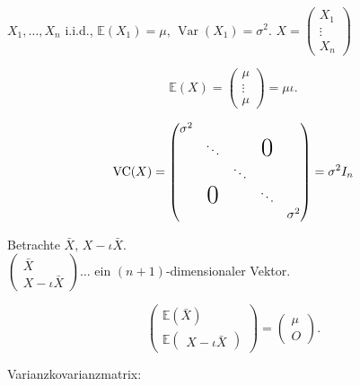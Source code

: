 \documentclass{tstextbook}
\DeclareMathOperator{\VC}{VC}
\DeclareMathOperator{\Var}{Var}
\begin{document}
\begin{example}
	\label{example.vc}
	
	$ X_1,\ldots,X_n $ i.i.d., $ \mathbb{E}{(X_1)}= \mu $, $ \Var(X_1) = \sigma^2 $.
	$ X = \begin{pmatrix}
		X_1 \\ \vdots \\ X_n
	\end{pmatrix} $ 

\[	\mathbb{E}(X) = \begin{pmatrix}
		\mu \\ \vdots \\ \mu
	\end{pmatrix} = \mu\iota. 
\]

\[ \VC(X) = \begin{pmatrix}
		
			\sigma^2 										\\
			& \ddots  		& 			& \text{\huge0}		\\
			& 				& \ddots               			\\
			& \text{\huge0} & 			& \ddots           	\\
			& 				& 			& 		& \sigma^2
		
	\end{pmatrix} = \sigma^2 I_n
\]

Betrachte $ \bar{X},\, X-\iota\bar{X} $. \\
$ \begin{pmatrix}
	\bar{X} \\ X-\iota\bar{X}
\end{pmatrix}\ldots $ ein $ (n+1) $-dimensionaler Vektor.


\[
\begin{pmatrix}\mathbb{E}\left(\bar{X}\right)\\
	\mathbb{E}\begin{pmatrix}X-\iota\bar{X}\end{pmatrix}
\end{pmatrix}=\begin{pmatrix}\mu\\
	O
\end{pmatrix}.
\]

Varianzkovarianzmatrix:


\end{example}
\end{document}

